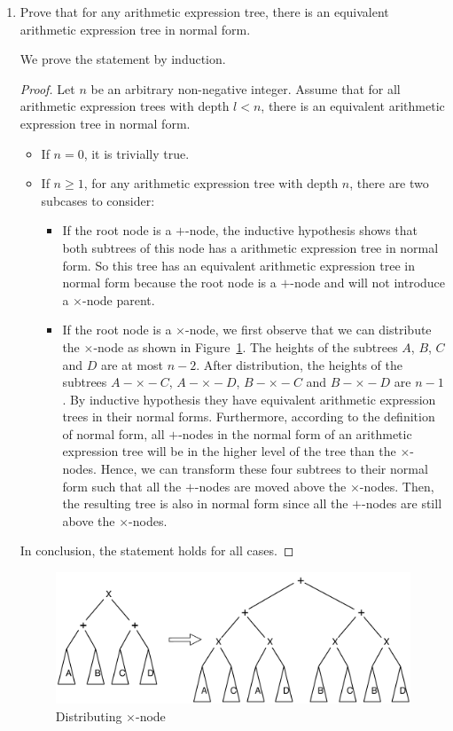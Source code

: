 \documentclass[letterpaper,11pt]{article}
\newcommand{\hdr}[2]{
   \newpage\setcounter{page}{1}
   \lhead{\fancyplain{}{\textbf{#1}}}
   \rhead{\fancyplain{}{\textbf{#2}}}
   \cfoot{\fancyplain{}{\thepage}}
}
\begin{document}
\begin{enumerate}
\hdr{CS 573 HW0}{Zigang Xiao (zxiao2) HW0 \#4}
\item
Prove that for any arithmetic expression tree, there is an equivalent arithmetic expression tree in normal form.

\begin{solution}
We prove the statement by induction. 
\begin{proof}
Let $n$ be an arbitrary non-negative integer.
Assume that for all arithmetic expression trees with depth $l<n$, 
there is an equivalent arithmetic expression tree in normal form. 
\begin{itemize}
  \item If $n=0$, it is trivially true.
  \item If $n \geqslant 1$, for any arithmetic expression tree with depth $n$, 
    there are two subcases to consider:
    \begin{itemize}
      \item If the root node is a $+$-node, the inductive hypothesis shows that
	both subtrees of this node has a arithmetic expression tree in normal
	form.  So this tree has an equivalent arithmetic expression tree in
	normal form because the root node is a $+$-node and will not introduce
	a $\times$-node parent.
      \item If the root node is a $\times$-node, we first observe that we can
	distribute the $\times$-node as shown in Figure~\ref{fig:expr}.  The
	heights of the subtrees $A$, $B$, $C$ and $D$ are at most $n-2$.  After
	distribution, the heights of the subtrees $A-\times-C$, $A-\times-D$,
	$B-\times-C$ and $B-\times-D$ are $n-1$.  By inductive hypothesis they
	have equivalent arithmetic expression trees in their normal forms.
	Furthermore, according to the definition of normal form, all $+$-nodes
	in the normal form of an arithmetic expression tree will be in the
	higher level of the tree than the $\times$-nodes.  Hence, we can
	transform these four subtrees to their normal form such that all the
	$+$-nodes are moved above the $\times$-nodes.  Then, the resulting tree
	is also in normal form since all the $+$-nodes are still above the
	$\times$-nodes.
    \end{itemize}
\end{itemize} 
In conclusion, the statement holds for all cases.
\end{proof}

\begin{figure}[hb]
  \centering
\includegraphics[width=.9\textwidth]{Fig/expression.pdf}
\caption{Distributing $\times$-node \label{fig:expr}}
\end{figure}
\end{solution}


\end{enumerate}
\end{document}
